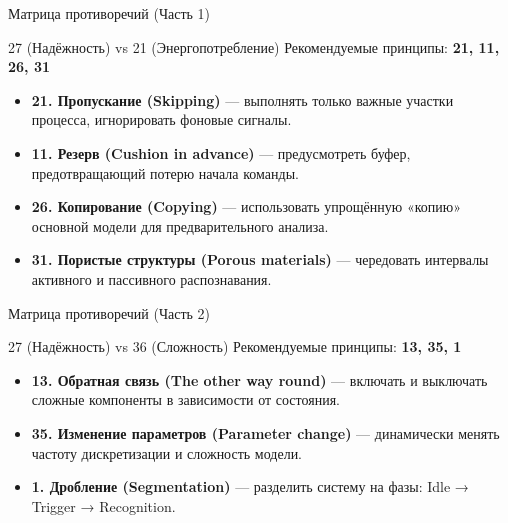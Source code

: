 \documentclass[aspectratio=169]{beamer}
\begin{document}
\begin{frame}{Матрица противоречий (Часть 1)}
  \begin{block}{27 (Надёжность) vs 21 (Энергопотребление)}
    Рекомендуемые принципы: \textbf{21, 11, 26, 31}
  \end{block}

  \begin{itemize}
    \item \textbf{21. Пропускание (Skipping)} — выполнять только важные участки процесса, игнорировать фоновые сигналы.
    \item \textbf{11. Резерв (Cushion in advance)} — предусмотреть буфер, предотвращающий потерю начала команды.
    \item \textbf{26. Копирование (Copying)} — использовать упрощённую «копию» основной модели для предварительного анализа.
    \item \textbf{31. Пористые структуры (Porous materials)} — чередовать интервалы активного и пассивного распознавания.
  \end{itemize}

  \bigskip
\end{frame}

\begin{frame}{Матрица противоречий (Часть 2)}
  \begin{block}{27 (Надёжность) vs 36 (Сложность)}
    Рекомендуемые принципы: \textbf{13, 35, 1}
    \end{block}

    \begin{itemize}
      \item \textbf{13. Обратная связь (The other way round)} — включать и выключать сложные компоненты в зависимости от состояния.
      \item \textbf{35. Изменение параметров (Parameter change)} — динамически менять частоту дискретизации и сложность модели.
      \item \textbf{1. Дробление (Segmentation)} — разделить систему на фазы: Idle → Trigger → Recognition.
    \end{itemize}
  \end{frame}
\end{document}
